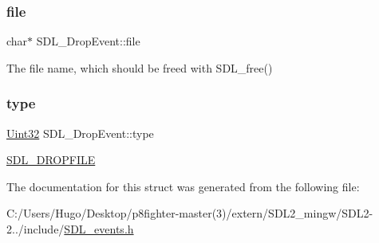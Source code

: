 \subsubsection{\texorpdfstring{file}{file}}
{\footnotesize\ttfamily char$\ast$ S\+D\+L\+\_\+\+Drop\+Event\+::file}

The file name, which should be freed with S\+D\+L\+\_\+free() \mbox{\label{struct_s_d_l___drop_event_a5ea27cfaa5f8d4940e9a69b68b3cc035}} 
\subsubsection{\texorpdfstring{type}{type}}
{\footnotesize\ttfamily \hyperlink{_s_d_l__stdinc_8h_add440eff171ea5f55cb00c4a9ab8672d}{Uint32} S\+D\+L\+\_\+\+Drop\+Event\+::type}

\hyperlink{_s_d_l__events_8h_a3b589e89be6b35c02e0dd34a55f3fccaad9238862d7aeaebff88be6453ee0fbab}{S\+D\+L\+\_\+\+D\+R\+O\+P\+F\+I\+LE} 

The documentation for this struct was generated from the following file\+:\begin{DoxyCompactItemize}
\item 
C\+:/\+Users/\+Hugo/\+Desktop/p8fighter-\/master(3)/extern/\+S\+D\+L2\+\_\+mingw/\+S\+D\+L2-\/2../include/\hyperlink{_s_d_l__events_8h}{S\+D\+L\+\_\+events.\+h}\end{DoxyCompactItemize}

